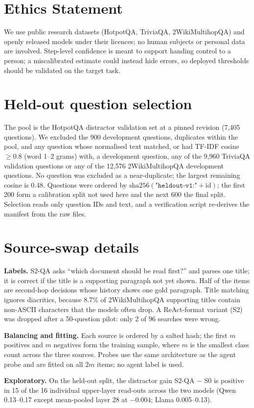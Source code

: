 \documentclass[11pt]{article}
\begin{document}
\section*{Ethics Statement}
We use public research datasets (HotpotQA, TriviaQA, 2WikiMultihopQA) and openly released models under their
licences; no human subjects or personal data are involved. Step-level confidence is meant to support handing
control to a person; a miscalibrated estimate could instead hide errors, so deployed thresholds should be validated
on the target task.



\appendix

\section{Held-out question selection}
\label{app:heldout}
The pool is the HotpotQA distractor validation set at a pinned revision (7,405 questions). We excluded the 900
development questions, duplicates within the pool, and any question whose normalised text matched, or had TF-IDF
cosine $\ge0.8$ (word 1--2 grams) with, a development question, any of the 9,960 TriviaQA validation questions or
any of the 12,576 2WikiMultihopQA development questions. No question was excluded as a near-duplicate; the largest
remaining cosine is 0.48. Questions were ordered by $\mathrm{sha256}(\texttt{"heldout-v1:"}+\mathrm{id})$; the
first 200 form a calibration split not used here and the next 600 the final split. Selection reads only question
IDs and text, and a verification script re-derives the manifest from the raw files.

\section{Source-swap details}
\label{app:swap}
\textbf{Labels.} S2-QA asks ``which document should be read first?'' and parses one title; it is correct if the
title is a supporting paragraph not yet shown. Half of the items are second-hop decisions whose history shows one
gold paragraph. Title matching ignores diacritics, because 8.7\% of 2WikiMultihopQA supporting titles contain
non-ASCII characters that the models often drop. A ReAct-format variant (S2) was dropped after a 50-question pilot:
only 2 of 96 searches were wrong.

\textbf{Balancing and fitting.} Each source is ordered by a salted hash; the first $m$ positives and $m$ negatives
form the training sample, where $m$ is the smallest class count across the three sources. Probes use the same
architecture as the agent probe and are fitted on all $2m$ items; no agent label is used.

\textbf{Exploratory.} On the held-out split, the distractor gain S2-QA $-$ S0 is positive in 15 of the 16
individual upper-layer read-outs across the two models (Qwen 0.13--0.17 except mean-pooled layer 28 at $-0.004$;
Llama 0.005--0.13).
\end{document}
